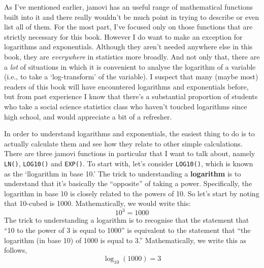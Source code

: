 \documentclass[
]{book}
\begin{document}
As I've mentioned earlier, jamovi has an useful range of mathematical functions built into it and there really wouldn't be much point in trying to describe or even list all of them. For the most part, I've focused only on those functions that are strictly necessary for this book. However I do want to make an exception for logarithms and exponentials. Although they aren't needed anywhere else in this book, they are \emph{everywhere} in statistics more broadly. And not only that, there are a \emph{lot} of situations in which it is convenient to analyse the logarithm of a variable (i.e., to take a `log-transform' of the variable). I suspect that many (maybe most) readers of this book will have encountered logarithms and exponentials before, but from past experience I know that there's a substantial proportion of students who take a social science statistics class who haven't touched logarithms since high school, and would appreciate a bit of a refresher.

In order to understand logarithms and exponentials, the easiest thing to do is to actually calculate them and see how they relate to other simple calculations. There are three jamovi functions in particular that I want to talk about, namely \texttt{LN()}, \texttt{LOG10()} and \texttt{EXP()}. To start with, let's consider \texttt{LOG10()}, which is known as the `llogarithm in base 10.' The trick to understanding a {\textbf{logarithm}} is to understand that it's basically the ``opposite'' of taking a power. Specifically, the logarithm in base 10 is closely related to the powers of 10. So let's start by noting that 10-cubed is 1000. Mathematically, we would write this:
\[ 
10^3 = 1000
\]
The trick to understanding a logarithm is to recognise that the statement that ``10 to the power of 3 is equal to 1000'' is equivalent to the statement that ``the logarithm (in base 10) of 1000 is equal to 3.'' Mathematically, we write this as follows,
\[
\log_{10}( 1000 ) = 3
\]
\end{document}
